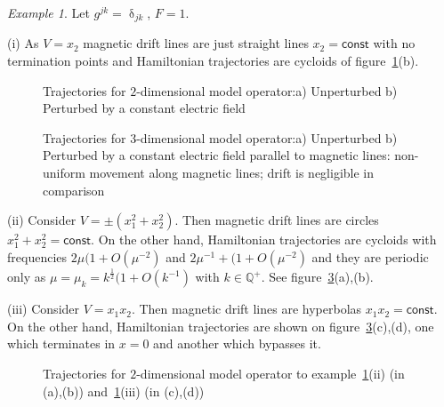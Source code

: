 \documentclass[12pt,oneside,openany,article]{memoir}
\numberwithin{equation}{chapter}
\theoremstyle{plain}
\theoremstyle{definition}
\theoremstyle{remark}
\newtheorem{example}[theorem]{Example}
\numberwithin{equation}{chapter}
\begin{document}
\begin{example}\label{ex-13-6-3}
Let $g^{jk}=\updelta_{jk}$, $F=1$.

\medskip\noindent
(i) As $V=x_2$ magnetic drift lines are just straight lines $x_2={{\mathsf{const}}}$ with no termination points and Hamiltonian trajectories are cycloids of figure~\ref{2D-model}(b).

\begin{figure}[h]
\centering
{} \qquad
{}
\caption{\label{2D-model} Trajectories for $2$-dimensional model operator:\newline a) Unperturbed b) Perturbed by a constant electric field}
\end{figure}

\vglue-10pt
\begin{figure}[h]
\centering
{} \qquad
{}
\caption{\label{3D-model} Trajectories for $3$-dimensional model operator:\newline a) Unperturbed b) Perturbed by a constant electric field parallel to magnetic lines: non-uniform movement along magnetic lines; drift is negligible in comparison}
\end{figure}

\medskip\noindent
(ii) Consider $V=\pm ( x_1^2 + x_2^2)$. Then magnetic drift lines are circles
$x_1^2+x_2^2={{\mathsf{const}}}$. On the other hand, Hamiltonian trajectories are cycloids with frequencies $2\mu (1+O(\mu^{-2})$ and $2\mu^{-1}+(1+O(\mu^{-2})$ and they are periodic only as $\mu=\mu_k = k^{\frac{1}{2}} (1+ O(k^{-1})$ with 
$k\in {{\mathbb{Q}}}^+$. See figure~\ref{ex-2D}(a),(b).

\medskip\noindent
(iii) Consider $V=x_1x_2$. Then magnetic drift lines are hyperbolas
$x_1x_2={{\mathsf{const}}}$. On the other hand, Hamiltonian trajectories are shown on figure~\ref{ex-2D}(c),(d), one which terminates in $x=0$ and another which bypasses it.
\begin{figure}[h]
\centering
{} \qquad
{}

 \qquad
{}
\caption{\label{ex-2D} Trajectories for $2$-dimensional model operator to example~\ref{ex-13-6-3}(ii) (in (a),(b)) and~\ref{ex-13-6-3}(iii) (in (c),(d))}
\end{figure}
\end{example}
\end{document}
